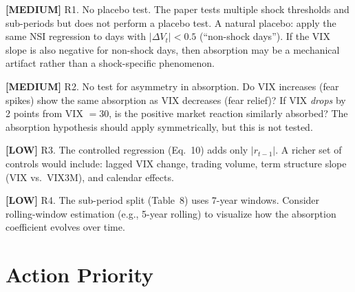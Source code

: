 \documentclass[12pt,a4paper]{article}
\newcommand{\med}[1]{\textcolor{warncolor}{\textbf{[MEDIUM]} #1}}
\newcommand{\low}[1]{\textcolor{okgreen}{\textbf{[LOW]} #1}}
\begin{document}
\med{R1. No placebo test.} The paper tests multiple shock thresholds and sub-periods but does not perform a placebo test. A natural placebo: apply the same NSI regression to days with $|\Delta V_t| < 0.5$ (``non-shock days''). If the VIX slope is also negative for non-shock days, then absorption may be a mechanical artifact rather than a shock-specific phenomenon.

\med{R2. No test for asymmetry in absorption.} Do VIX increases (fear spikes) show the same absorption as VIX decreases (fear relief)? If VIX \emph{drops} by 2 points from VIX $= 30$, is the positive market reaction similarly absorbed? The absorption hypothesis should apply symmetrically, but this is not tested.

\low{R3. The controlled regression (Eq.~10) adds only $|r_{t-1}|$.} A richer set of controls would include: lagged VIX change, trading volume, term structure slope (VIX vs.\ VIX3M), and calendar effects.

\low{R4. The sub-period split (Table~8) uses 7-year windows.} Consider rolling-window estimation (e.g., 5-year rolling) to visualize how the absorption coefficient evolves over time.

\section*{Action Priority}
\end{document}
